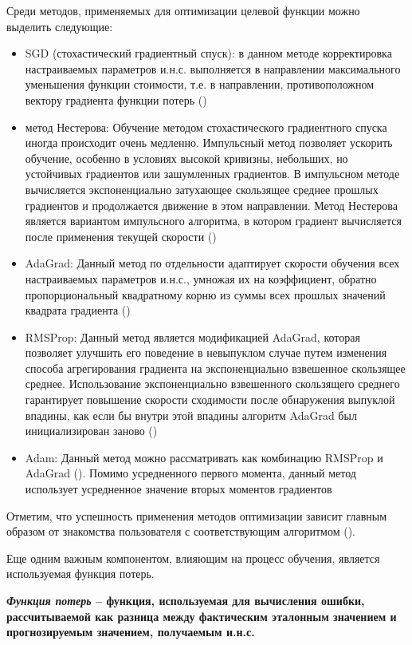 Среди методов, применяемых для оптимизации целевой функции можно выделить следующие:

\begin{itemize}
	\item SGD (стохастический градиентный спуск): в данном методе корректировка настраиваемых параметров и.н.с. выполняется в направлении максимального уменьшения функции стоимости, т.е. в направлении, противоположном вектору градиента функции потерь ()
	\item метод Нестерова: Обучение методом стохастического градиентного спуска иногда происходит очень медленно. Импульсный метод позволяет ускорить обучение, особенно в условиях высокой кривизны, небольших, но устойчивых градиентов или зашумленных градиентов. В импульсном методе вычисляется экспоненциально затухающее скользящее среднее прошлых градиентов и продолжается движение в этом направлении. Метод Нестерова является вариантом импульсного алгоритма, в котором градиент вычисляется после применения текущей скорости ()
	\item AdaGrad: Данный метод по отдельности адаптирует скорости обучения всех настраиваемых параметров и.н.с., умножая их на коэффициент, обратно пропорциональный квадратному корню из суммы всех прошлых значений квадрата градиента ()
	\item RMSProp: Данный метод является модификацией AdaGrad, которая позволяет улучшить его поведение в невыпуклом случае путем изменения способа агрегирования градиента на экспоненциально взвешенное скользящее среднее. Использование экспоненциально взвешенного скользящего среднего гарантирует повышение скорости сходимости после обнаружения выпуклой впадины, как если бы внутри этой впадины алгоритм AdaGrad был инициализирован заново ()
	\item Adam: Данный метод можно рассматривать как комбинацию RMSProp и AdaGrad (). Помимо усредненного первого момента, данный метод использует усредненное значение вторых моментов градиентов
\end{itemize} 

Отметим, что успешность применения методов оптимизации зависит главным образом от знакомства пользователя с соответствующим алгоритмом ().

Еще одним важным компонентом, влияющим на процесс обучения, является используемая функция потерь.

\textbf{\textit{Функция потерь} -- функция, используемая для вычисления ошибки, рассчитываемой как разница между фактическим эталонным значением и прогнозируемым значением, получаемым и.н.с.}

